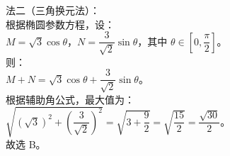 {  法二（三角换元法）：\\
  根据椭圆参数方程，设：\\
  \(M = \sqrt{3}\cos\theta\)，\(N = \dfrac{3}{\sqrt{2}}\sin\theta\)，其中 \(\theta \in \left[0, \dfrac{\pi}{2}\right]\)。\\
  则：\\
  \(M + N = \sqrt{3}\cos\theta + \dfrac{3}{\sqrt{2}}\sin\theta\)。\\
  根据辅助角公式，最大值为：\\
  \(\sqrt{(\sqrt{3})^2 + \left(\dfrac{3}{\sqrt{2}}\right)^2} = \sqrt{3 + \dfrac{9}{2}} = \sqrt{\dfrac{15}{2}} = \dfrac{\sqrt{30}}{2}\)。\\
  故选 B。%
}

\newcommand{\qFiveStem}{设正数 \(a, b, c\) 满足 \(abc = 8\)。证明：\(1 < \dfrac{1}{\sqrt{1 + a}} + \dfrac{1}{\sqrt{1 + b}} + \dfrac{1}{\sqrt{1 + c}} < 2\)。}
